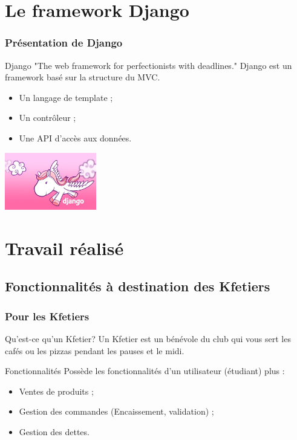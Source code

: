 \documentclass{polytech-presentation}
\begin{document}
	\section<presentation>{Le framework Django}%
            \begin{frame}
                \frametitle{Présentation de Django}
                \begin{block}{Django}
                    "The web framework for perfectionists with deadlines." Django est un framework basé sur la structure du MVC.\pause                    
                \end{block}
                \begin{itemize}
                    \item Un langage de template ;
                    \item Un contrôleur ;
                    \item Une API d'accès aux données.
                \end{itemize}
                \hfill \includegraphics[width=4cm]{logos/pony.jpg}
                    \end{frame}%

        \section<presentation>{Travail réalisé}%

            \subsection<presentation>{Fonctionnalités à destination des Kfetiers}%
                \begin{frame}
		  \frametitle{Pour les Kfetiers}
		    \begin{block}{Qu'est-ce qu'un Kfetier?}
		     Un Kfetier est un bénévole du club qui vous sert les cafés ou les pizzas pendant les pauses et le
midi.
		    \end{block}

                    \begin{block}{Fonctionnalités}
                     Possède les fonctionnalités d'un utilisateur (étudiant) plus :
		      \begin{itemize}
		       \item Ventes de produits ;
		       \item Gestion des commandes (Encaissement, validation) ;
		       \item Gestion des dettes.
		      \end{itemize}
                    \end{block}
                           \end{frame}
\end{document}

